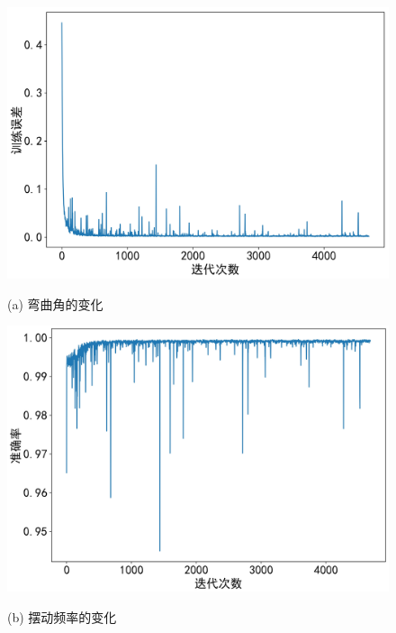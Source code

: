 	\begin{figure}[!htp]    
	\begin{minipage}[t]{0.5\linewidth}%
		\centering    
		\includegraphics[width=1\linewidth]{figure/chap3/loss.jpg}    
		\caption*{(a) 弯曲角的变化}%
		\label{fig:angle}    
	\end{minipage}    
	\begin{minipage}[t]{0.5\linewidth}%
		\centering    
		\includegraphics[width=1\linewidth]{figure/chap3/acc.jpg}    
		\caption*{(b) 摆动频率的变化}
		\label{fig:freq}
	\end{minipage}
	\label{fig:train_progress}
	\end{figure}
